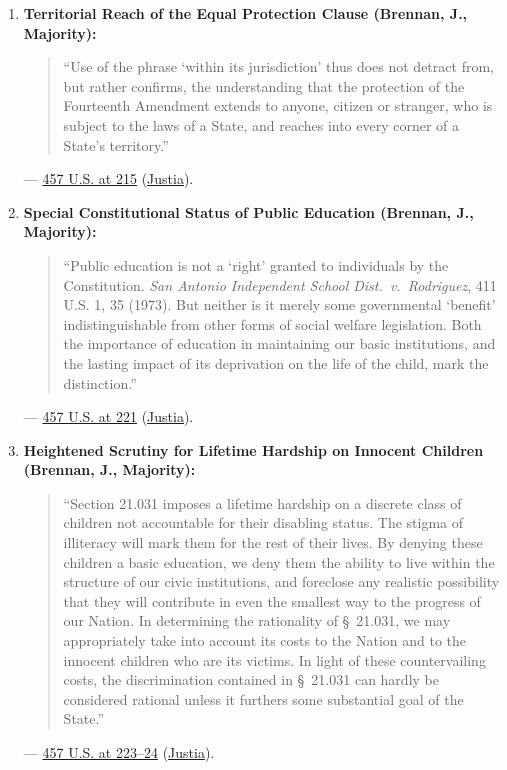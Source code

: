 \documentclass[12pt]{article}
\begin{document}
\begin{enumerate}
    \item \textbf{Territorial Reach of the Equal Protection Clause (Brennan, J., Majority):}
    \begin{quote}
        ``Use of the phrase `within its jurisdiction' thus does not detract from, but rather confirms, the understanding that the protection of the Fourteenth Amendment extends to anyone, citizen or stranger, who is subject to the laws of a State, and reaches into every corner of a State's territory.''
    \end{quote}
    --- \href{https://www.law.cornell.edu/supremecourt/text/457/202}{457 U.S. at 215} (\href{https://supreme.justia.com/cases/federal/us/457/202/}{Justia}).

    \item \textbf{Special Constitutional Status of Public Education (Brennan, J., Majority):}
    \begin{quote}
        ``Public education is not a `right' granted to individuals by the Constitution. \textit{San Antonio Independent School Dist.\ v.\ Rodriguez}, 411 U.S. 1, 35 (1973). But neither is it merely some governmental `benefit' indistinguishable from other forms of social welfare legislation. Both the importance of education in maintaining our basic institutions, and the lasting impact of its deprivation on the life of the child, mark the distinction.''
    \end{quote}
    --- \href{https://www.law.cornell.edu/supremecourt/text/457/202}{457 U.S. at 221} (\href{https://supreme.justia.com/cases/federal/us/457/202/}{Justia}).

    \item \textbf{Heightened Scrutiny for Lifetime Hardship on Innocent Children (Brennan, J., Majority):}
    \begin{quote}
        ``Section 21.031 imposes a lifetime hardship on a discrete class of children not accountable for their disabling status. The stigma of illiteracy will mark them for the rest of their lives. By denying these children a basic education, we deny them the ability to live within the structure of our civic institutions, and foreclose any realistic possibility that they will contribute in even the smallest way to the progress of our Nation. In determining the rationality of \S~21.031, we may appropriately take into account its costs to the Nation and to the innocent children who are its victims. In light of these countervailing costs, the discrimination contained in \S~21.031 can hardly be considered rational unless it furthers some substantial goal of the State.''
    \end{quote}
    --- \href{https://www.law.cornell.edu/supremecourt/text/457/202}{457 U.S. at 223--24} (\href{https://supreme.justia.com/cases/federal/us/457/202/}{Justia}).


\end{enumerate}
\end{document}
